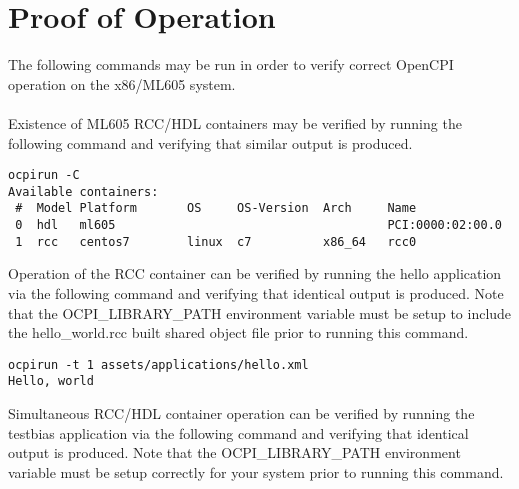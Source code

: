 \documentclass{article}
\begin{document}
\section{Proof of Operation}
The following commands may be run in order to verify correct OpenCPI operation on the x86/ML605 system.\\ \\
Existence of ML605 RCC/HDL containers may be verified by running the following command and verifying that similar output is produced.
\begin{lstlisting}
ocpirun -C
Available containers:
 #  Model Platform       OS     OS-Version  Arch     Name
 0  hdl   ml605                                      PCI:0000:02:00.0
 1  rcc   centos7        linux  c7          x86_64   rcc0
\end{lstlisting}
Operation of the RCC container can be verified by running the hello application via the following command and verifying that identical output is produced. Note that the OCPI\_LIBRARY\_PATH environment variable must be setup to include the hello\_world.rcc built shared object file prior to running this command.
\begin{lstlisting}
ocpirun -t 1 assets/applications/hello.xml
Hello, world
\end{lstlisting}
Simultaneous RCC/HDL container operation can be verified by running the testbias application via the following command and verifying that identical output is produced. Note that the OCPI\_LIBRARY\_PATH environment variable must be setup correctly for your system prior to running this command.
\end{document}
